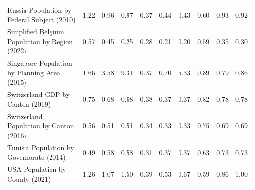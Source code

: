 \begin{tabular}{lccc|ccc|ccc}
              Russia Population by Federal Subject (2010) &                      1.22 &                      0.96 &                         0.97 &                        0.37 &                        0.44 &                           0.43 &                          0.60 &                          0.93 &                             0.92 \\
           Simplified Belgium Population by Region (2022) &                      0.57 &                      0.45 &                         0.25 &                        0.28 &                        0.21 &                           0.20 &                          0.59 &                          0.35 &                             0.30 \\
             Singapore Population by Planning Area (2015) &                      1.66 &                      3.58 &                         9.31 &                        0.37 &                        0.70 &                           5.33 &                          0.89 &                          0.79 &                             0.86 \\
                         Switzerland GDP by Canton (2019) &                      0.75 &                      0.68 &                         0.68 &                        0.38 &                        0.37 &                           0.37 &                          0.82 &                          0.78 &                             0.78 \\
                  Switzerland Population by Canton (2016) &                      0.56 &                      0.51 &                         0.51 &                        0.34 &                        0.33 &                           0.33 &                          0.75 &                          0.69 &                             0.69 \\
                 Tunisia Population by Governorate (2014) &                      0.49 &                      0.58 &                         0.58 &                        0.31 &                        0.37 &                           0.37 &                          0.63 &                          0.73 &                             0.73 \\
                          USA Population by County (2021) &                      1.26 &                      1.07 &                         1.50 &                        0.39 &                        0.53 &                           0.67 &                          0.59 &                          0.86 &                             1.00 \\

\end{tabular}
